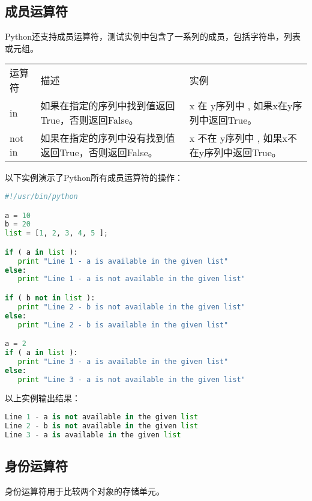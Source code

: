 \subsection{成员运算符}
Python还支持成员运算符，测试实例中包含了一系列的成员，包括字符串，列表或元组。

\begin{tabular}{l|l|l}
运算符&	描述&	实例\\
in&	如果在指定的序列中找到值返回True，否则返回False。	&x 在 y序列中 , 如果x在y序列中返回True。\\
not in&	如果在指定的序列中没有找到值返回True，否则返回False。	&x 不在 y序列中 , 如果x不在y序列中返回True。
\end{tabular}
以下实例演示了Python所有成员运算符的操作：
\begin{lstlisting}[language=Python]
#!/usr/bin/python

a = 10
b = 20
list = [1, 2, 3, 4, 5 ];

if ( a in list ):
   print "Line 1 - a is available in the given list"
else:
   print "Line 1 - a is not available in the given list"

if ( b not in list ):
   print "Line 2 - b is not available in the given list"
else:
   print "Line 2 - b is available in the given list"

a = 2
if ( a in list ):
   print "Line 3 - a is available in the given list"
else:
   print "Line 3 - a is not available in the given list"
\end{lstlisting}
以上实例输出结果：
\begin{lstlisting}[language=Python]
Line 1 - a is not available in the given list
Line 2 - b is not available in the given list
Line 3 - a is available in the given list
\end{lstlisting}


\subsection{身份运算符}
身份运算符用于比较两个对象的存储单元。

